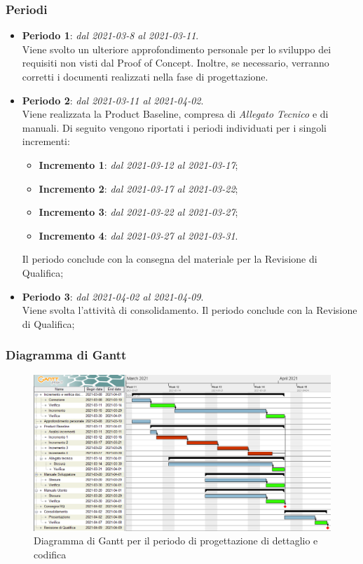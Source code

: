 \subsubsection{Periodi}

\begin{itemize}
\item \textbf{Periodo 1}: \textit{dal 2021-03-8 al 2021-03-11}. \\
Viene svolto un ulteriore approfondimento personale per lo sviluppo dei requisiti non visti dal Proof of Concept. Inoltre, se necessario, verranno corretti i documenti realizzati nella fase di progettazione.
\item \textbf{Periodo 2}: \textit{dal 2021-03-11 al 2021-04-02}. \\
Viene realizzata la Product Baseline, compresa di \textit{Allegato Tecnico} e di manuali. Di seguito vengono riportati i periodi individuati per i singoli incrementi:
\begin{itemize}
\item \textbf{Incremento 1}: \textit{dal 2021-03-12 al 2021-03-17};
\item \textbf{Incremento 2}: \textit{dal 2021-03-17 al 2021-03-22};
\item \textbf{Incremento 3}: \textit{dal 2021-03-22 al 2021-03-27};
\item \textbf{Incremento 4}: \textit{dal 2021-03-27 al 2021-03-31}.
\end{itemize}
Il periodo conclude con la consegna del materiale per la Revisione di Qualifica;
\item \textbf{Periodo 3}: \textit{dal 2021-04-02 al 2021-04-09}. \\
Viene svolta l'attività di consolidamento. Il periodo conclude con la Revisione di Qualifica;
\end{itemize}

\subsubsection{Diagramma di Gantt}

\begin{figure}[H]
\centering

\centerline{\includegraphics[scale=0.6]{res/Pianificazione/Gantt/codifica}}
\caption{Diagramma di Gantt per il periodo di progettazione di dettaglio e codifica}
\end{figure}

